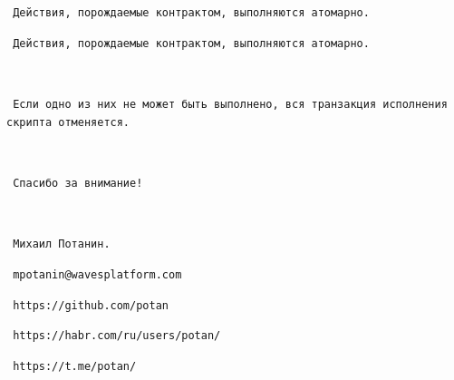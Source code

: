 \documentclass[11pt,handout,pdf,hyperref={unicode}]{beamer}
\begin{document}
\begin{frame}[fragile]

\texttt{ Действия, порождаемые контрактом, выполняются атомарно. }

\end{frame}

\begin{frame}[fragile]

\texttt{ Действия, порождаемые контрактом, выполняются атомарно. }

\texttt{ }

\texttt{ Если одно из них не может быть выполнено, вся транзакция исполнения скрипта отменяется. }

\end{frame}

\begin{frame}[fragile]

\texttt{ }

\texttt{ Спасибо за внимание! }

\texttt{ }

\texttt{ Михаил Потанин. }

\texttt{ mpotanin@wavesplatform.com }

\texttt{ https://github.com/potan }

\texttt{ https://habr.com/ru/users/potan/ }

\texttt{ https://t.me/potan/ }

\end{frame}
\end{document}
